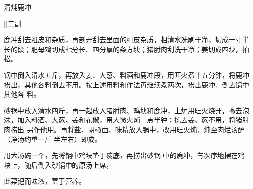 \begin{recipe}{清炖鹿冲}

\ingredients

[\footnotemark]{二副}

\preparation

\step 鹿冲刮去祖皮和杂质，再剖开刮去里面的粗皮杂质，相清水洗刷干净，切成一寸半
长的段；肥母鸡切成七分长、四分厚的条方块；猪肘肉刮洗干净；姜切成四块，拍松。

\step 锅中倒入清水五斤，再放入姜、大葱、料酒和鹿冲段，用旺火煮十五分钟，将鹿冲
捞出，其他各料倒去不用。按上述用料和作法再继续煮两次，捞出鹿冲，倒去锅中其他各
料。

\step 砂锅中放入清水四斤，再一起放入猪肘肉、鸡块和鹿冲，上炉用旺火烧开，撇去泡
沫，加入料酒、大葱、姜和花椒，用大微火炖一点半钟；拣去姜、葱不用，将猪肘肉捞出
另作他用。再将盐、胡椒面、味精放入锅中，改用旺火炖，炖至肉烂汤酽（净汤约重一斤
半左右）即成。

\step 用大汤碗一个，先将锅中鸡块垫于碗底，再捞出砂锅 中的鹿冲，有次序地摆在鸡
块上，随后倒入砂锅中的原汤上席。

\features

此菜钯而味浓，富于营养。


\end{recipe}

